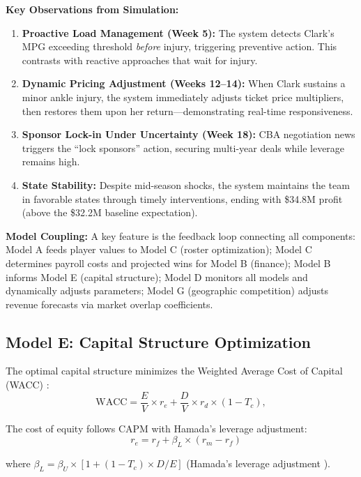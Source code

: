 \documentclass{mcmthesis}
\begin{document}
\textbf{Key Observations from Simulation:}
\begin{enumerate}
\item \textbf{Proactive Load Management (Week 5):} The system detects Clark's MPG exceeding threshold \textit{before} injury, triggering preventive action. This contrasts with reactive approaches that wait for injury.
\item \textbf{Dynamic Pricing Adjustment (Weeks 12--14):} When Clark sustains a minor ankle injury, the system immediately adjusts ticket price multipliers, then restores them upon her return---demonstrating real-time responsiveness.
\item \textbf{Sponsor Lock-in Under Uncertainty (Week 18):} CBA negotiation news triggers the ``lock sponsors'' action, securing multi-year deals while leverage remains high.
\item \textbf{State Stability:} Despite mid-season shocks, the system maintains the team in favorable states through timely interventions, ending with \$34.8M profit (above the \$32.2M baseline expectation).
\end{enumerate}

\textbf{Model Coupling:} A key feature is the feedback loop connecting all components: Model A feeds player values to Model C (roster optimization); Model C determines payroll costs and projected wins for Model B (finance); Model B informs Model E (capital structure); Model D monitors all models and dynamically adjusts parameters; Model G (geographic competition) adjusts revenue forecasts via market overlap coefficients.

\subsection{Model E: Capital Structure Optimization}
The optimal capital structure minimizes the Weighted Average Cost of Capital (WACC) \cite{brealey2020}:
\begin{equation}
\text{WACC} = \frac{E}{V} \times r_e + \frac{D}{V} \times r_d \times (1 - T_c), 
\end{equation}

The cost of equity follows CAPM with Hamada’s leverage adjustment:
\begin{equation}
\quad r_e = r_f + \beta_L \times (r_m - r_f)
\end{equation}


where $\beta_L = \beta_U \times [1 + (1-T_c) \times D/E]$ (Hamada's leverage adjustment \cite{hamada1972}). 
\end{document}
